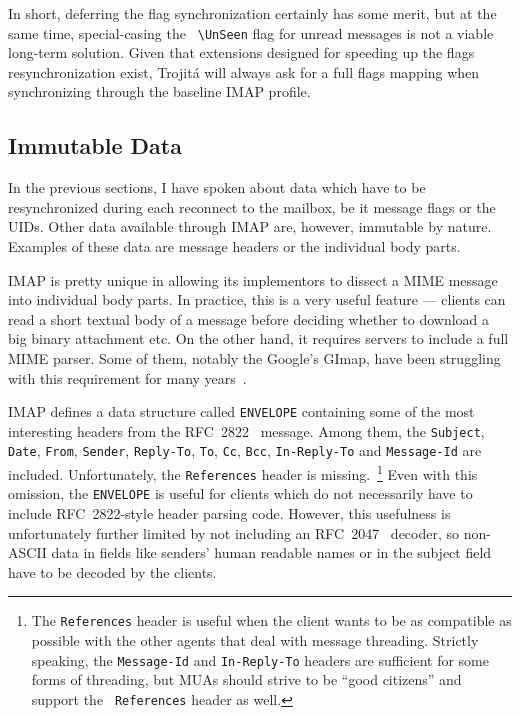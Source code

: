 \documentclass[trojita]{subfiles}
\begin{document}
In short, deferring the flag synchronization certainly has some merit, but at the same time, special-casing the {\tt
{\textbackslash}UnSeen} flag for unread messages is not a viable long-term solution.  Given that extensions designed for
speeding up the flags resynchronization exist, Trojitá will always ask for a full flags mapping when synchronizing
through the baseline IMAP profile.

\subsection{Immutable Data}
\label{sec:imap-immutable-data}

In the previous sections, I have spoken about data which have to be resynchronized during each reconnect to the mailbox,
be it message flags or the UIDs.  Other data available through IMAP are, however, immutable by nature.  Examples of
these data are message headers or the individual body parts.

IMAP is pretty unique in allowing its implementors to dissect a MIME message~\cite{rfc2045} into individual body parts.
In practice, this is a very useful feature --- clients can read a short textual body of a message before deciding whether
to download a big binary attachment etc.  On the other hand, it requires servers to include a full MIME parser.  Some of
them, notably the Google's GImap, have been struggling with this requirement for many
years~\cite{gmail-bodystructure-sucks}.

IMAP defines a data structure called {\tt ENVELOPE} containing some of the most interesting headers from the
RFC~2822~\cite{rfc2822} message.  Among them, the {\tt Subject}, {\tt Date}, {\tt From}, {\tt Sender}, {\tt Reply-To},
{\tt To}, {\tt Cc}, {\tt Bcc}, {\tt In-Reply-To} and {\tt Message-Id} are included.  Unfortunately, the {\tt References}
header is missing.~\footnote{The {\tt References} header is useful when the client wants to be as compatible as possible
with the other agents that deal with message threading.  Strictly speaking, the {\tt Message-Id} and {\tt In-Reply-To}
headers are sufficient for some forms of threading, but MUAs should strive to be ``good citizens'' and support the {\tt
References} header as well.}  Even with this omission, the {\tt ENVELOPE} is useful for clients which do not necessarily
have to include RFC~2822-style header parsing code.  However, this usefulness is unfortunately further limited by not
including an RFC~2047~\cite{rfc2047} decoder, so non-ASCII data in fields like senders' human readable names or in the
subject field have to be decoded by the clients.
\end{document}
